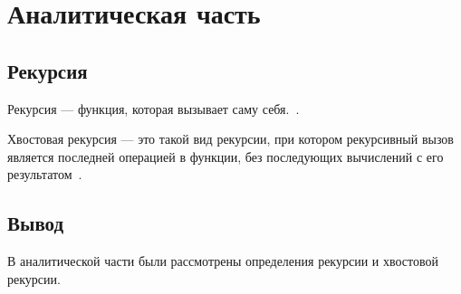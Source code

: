 \chapter{Аналитическая часть}

\section{Рекурсия}

Рекурсия — функция, которая вызывает саму себя.~\cite{recursion_def}.

Хвостовая рекурсия — это такой вид рекурсии, при котором рекурсивный вызов является последней операцией в функции, без последующих вычислений с его результатом~\cite{tail_recursion}.

\section*{Вывод}

В аналитической части были рассмотрены определения рекурсии и хвостовой рекурсии.

\clearpage
